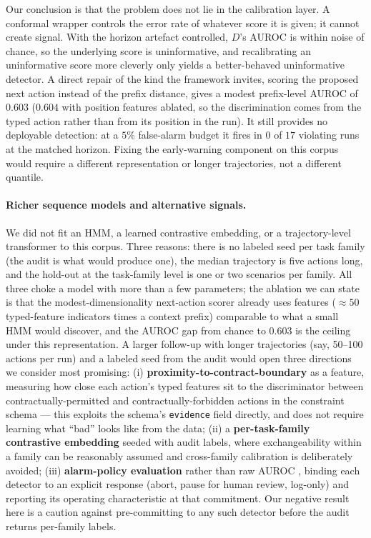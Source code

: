 \documentclass{article}
\begin{document}
Our conclusion is that the problem does not lie in the calibration layer. A conformal wrapper controls the error rate of whatever score it is given; it cannot create signal. With the horizon artefact controlled, $D$'s AUROC is within noise of chance, so the underlying score is uninformative, and recalibrating an uninformative score more cleverly only yields a better-behaved uninformative detector. A direct repair of the kind the framework invites, scoring the proposed next action instead of the prefix distance, gives a modest prefix-level AUROC of $0.603$ ($0.604$ with position features ablated, so the discrimination comes from the typed action rather than from its position in the run). It still provides no deployable detection: at a $5\%$ false-alarm budget it fires in $0$ of $17$ violating runs at the matched horizon. Fixing the early-warning component on this corpus would require a different representation or longer trajectories, not a different quantile.

\paragraph{Richer sequence models and alternative signals.}
We did not fit an HMM, a learned contrastive embedding, or a trajectory-level transformer to this corpus. Three reasons: there is no labeled seed per task family (the audit is what would produce one), the median trajectory is five actions long, and the hold-out at the task-family level is one or two scenarios per family. All three choke a model with more than a few parameters; the ablation we can state is that the modest-dimensionality next-action scorer already uses features ($\approx 50$ typed-feature indicators times a context prefix) comparable to what a small HMM would discover, and the AUROC gap from chance to $0.603$ is the ceiling under this representation. A larger follow-up with longer trajectories (say, 50--100 actions per run) and a labeled seed from the audit would open three directions we consider most promising: (i) \textbf{proximity-to-contract-boundary} as a feature, measuring how close each action's typed features sit to the discriminator between contractually-permitted and contractually-forbidden actions in the constraint schema --- this exploits the schema's \texttt{evidence} field directly, and does not require learning what ``bad'' looks like from the data; (ii) a \textbf{per-task-family contrastive embedding} seeded with audit labels, where exchangeability within a family can be reasonably assumed and cross-family calibration is deliberately avoided; (iii) \textbf{alarm-policy evaluation} rather than raw AUROC \citep{barber2023conformal}, binding each detector to an explicit response (abort, pause for human review, log-only) and reporting its operating characteristic at that commitment. Our negative result here is a caution against pre-committing to any such detector before the audit returns per-family labels.
\end{document}
